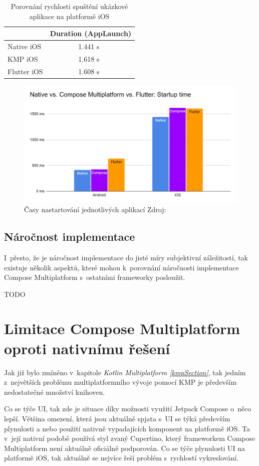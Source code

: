 \begin{table}[H]
  \centering
  \caption{Porovnání rychlosti spuštění ukázkové aplikace na platformě iOS}
  \begin{tabular}{|l|c|}
      \hline
       & Duration (AppLaunch) \\
      \hline
      Native iOS & 1.441 s~\\
      KMP iOS & 1.618 s~\\
      Flutter iOS & 1.608 s~\\
      \hline
  \end{tabular}
  \label{tab:app_launch_duration_ios}
\end{table}


\begin{figure}[H]
  \centering
  \includegraphics[width=.7\textwidth]{chart_startup_times.png}
  \caption{Časy nastartování jednotlivých aplikací Zdroj: \cite{imgAndroidFlutterCompose}}
  \label{fig:chart_startup_times}
\end{figure}

\subsection{Náročnost implementace}
I~přesto, že je náročnost implementace do jisté míry subjektivní záležitostí, tak existuje několik aspektů, které mohou k~porovnání 
náročnosti implementace Compose Multiplatform s~ostatními frameworky posloužit. 

TODO

\section{Limitace Compose Multiplatform oproti nativnímu řešení} 
Jak již bylo zmíněno v~kapitole \textit{Kotlin Multiplatform \ref{kmpSection}}, tak jedním z~největších problému multiplatformního vývoje pomocí KMP je
především nedostatečné množství knihoven. 

Co se týče UI, tak zde je situace díky možnosti využití Jetpack Compose o~něco lepší. Většina omezení, která jsou
aktuálně spjata s~UI se týká především plynulosti a nebo použití nativně vypadajících komponent na platformě iOS.
Ta v~její nativní podobě používá styl zvaný Cupertino, který frameworkem Compose Multiplatform není aktuálně oficiálně podporován. 
Co se týče plynulosti UI na platformě iOS, tak aktuálně se nejvíce řeší problém s~rychlostí vykreslování.

